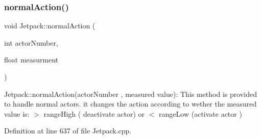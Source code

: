 \subsubsection{\texorpdfstring{normal\+Action()}{normalAction()}}
{\footnotesize\ttfamily void Jetpack\+::normal\+Action (\begin{DoxyParamCaption}\item[{int}]{actor\+Number,  }\item[{float}]{measurment }\end{DoxyParamCaption})}

Jetpack\+::normal\+Action(actor\+Number , measured value)\+: This method is provided to handle normal actors. it changes the action according to wether the measured value is\+: $>$ range\+High ( deactivate actor) or $<$ range\+Low (activate actor ) 

Definition at line 637 of file Jetpack.\+cpp.


